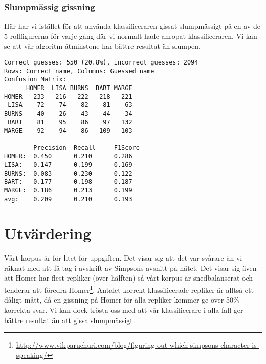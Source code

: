 \documentclass[a5paper]{article}
\begin{document}
\subsubsection{Slumpmässig gissning}
Här har vi istället för att använda klassificeraren gissat slumpmässigt på en av
de 5 rollfigurerna för varje gång där vi normalt hade anropat klassificeraren.
Vi kan se att vår algoritm åtminstone har bättre resultat än slumpen.
\begin{verbatim}
Correct guesses: 550 (20.8%), incorrect guesses: 2094
Rows: Correct name, Columns: Guessed name
Confusion Matrix:
      HOMER  LISA BURNS  BART MARGE 
HOMER   233   216   222   218   221 
 LISA    72    74    82    81    63 
BURNS    40    26    43    44    34 
 BART    81    95    86    97   132 
MARGE    92    94    86   109   103 

        Precision  Recall     F1Score    
HOMER:  0.450      0.210      0.286      
LISA:   0.147      0.199      0.169      
BURNS:  0.083      0.230      0.122      
BART:   0.177      0.198      0.187      
MARGE:  0.186      0.213      0.199      
avg:    0.209      0.210      0.193      
\end{verbatim}



\section{Utvärdering}
Vårt korpus är för litet för uppgiften. Det visar sig att det var svårare än vi
räknat med att få tag i avskrift av Simpsons-avsnitt på nätet. Det visar sig
även att Homer har flest repliker (över hälften) så vårt korpus är
snedbalanserat och tenderar att föredra
Homer\footnote{\url{http://www.vikparuchuri.com/blog/figuring-out-which-simpsons-character-is-speaking/}}.
Antalet korrekt klassificerade repliker är alltså ett dåligt mått, då en
gissning på Homer för alla repliker kommer ge över 50\% korrekta svar. Vi kan
dock trösta oss med att vår klassificerare i alla fall ger bättre resultat än
att gissa slumpmässigt.


\end{document}

